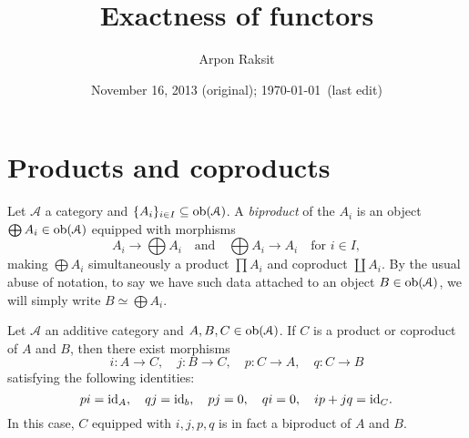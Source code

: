 


\title{Exactness of functors}
\author{Arpon Raksit}
\date{November 16, 2013 (original); \today\ (last edit)}


\maketitle
\thispagestyle{fancy}


\renewcommand{\A}{\mathcal{A}}
\renewcommand{\B}{\mathcal{B}}


\section{Products and coproducts}

\begin{definition}
  \label{biproduct}
  Let $\A$ a category and $\{A_i\}_{i \in I} \subseteq \ob(\A)$. A
  \emph{biproduct} of the $A_i$ is an object $\bigoplus A_i \in
  \ob(\A)$ equipped with morphisms
  \[
  \textstyle{A_i \to \bigoplus A_i \quad\text{and}\quad \bigoplus A_i
    \to A_i \quad \text{for }i \in I,}
  \]
  making $\bigoplus A_i$ simultaneously a product $\prod A_i$ and
  coproduct $\coprod A_i$. By the usual abuse of notation, to say we
  have such data attached to an object $B \in \ob(\A)$, we will simply
  write $B \simeq \bigoplus A_i$.
\end{definition}

\begin{lemma}
  \label{biproduct-formulae}
  Let $\A$ an additive category and $A,B,C \in \ob(\A)$. If $C$ is a
  product or coproduct of $A$ and $B$, then there exist morphisms
  \[
  i : A \to C, \quad j : B \to C, \quad p : C \to A, \quad q : C \to B
  \]
  satisfying the following identities:
  \[
  pi = \mathrm{id}_A, \quad qj = \mathrm{id}_b, \quad pj = 0, \quad qi = 0, \quad
  ip+jq = \mathrm{id}_C.
  \]
  In this case, $C$ equipped with $i,j,p,q$ is in fact a biproduct of
  $A$ and $B$.
\end{lemma}

